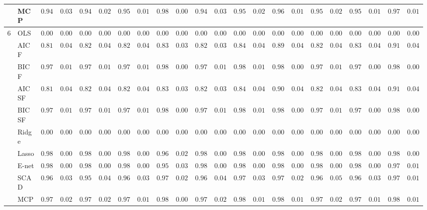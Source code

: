 \begin{tabular}{p{0.2cm}p{1cm}|p{0.6cm}p{0.6cm}|p{0.6cm}p{0.6cm}p{0.6cm}p{0.6cm}p{0.6cm}p{0.6cm}|p{0.6cm}p{0.6cm}p{0.6cm}p{0.6cm}p{0.6cm}p{0.6cm}|p{0.6cm}p{0.6cm}p{0.6cm}p{0.6cm}p{0.6cm}p{0.6cm}}
 & MCP  & $0.9483$ & $0.0345$ & $0.9439$ & $0.0255$ & $0.9562$ & $0.0197$ & $0.9809$ & $0.0089$ & $0.9468$ & $0.0361$ & $0.9568$ & $0.0276$ & $0.9694$ & $0.0164$ & $0.9514$ & $0.0295$ & $0.9559$ & $0.0197$ & $0.9791$ & $0.0119$ \\\hline
6 & OLS  & $0.0000$ & $0.0000$ & $0.0000$ & $0.0000$ & $0.0000$ & $0.0000$ & $0.0000$ & $0.0000$ & $0.0000$ & $0.0000$ & $0.0000$ & $0.0000$ & $0.0000$ & $0.0000$ & $0.0000$ & $0.0000$ & $0.0000$ & $0.0000$ & $0.0000$ & $0.0000$ \\
 & AIC F  & $0.8105$ & $0.0412$ & $0.8216$ & $0.0420$ & $0.8236$ & $0.0457$ & $0.8323$ & $0.0377$ & $0.8239$ & $0.0384$ & $0.8416$ & $0.0421$ & $0.8984$ & $0.0444$ & $0.8242$ & $0.0431$ & $0.8373$ & $0.0481$ & $0.9121$ & $0.0466$ \\
 & BIC F  & $0.9788$ & $0.0104$ & $0.9765$ & $0.0111$ & $0.9775$ & $0.0110$ & $0.9801$ & $0.0091$ & $0.9768$ & $0.0105$ & $0.9802$ & $0.0113$ & $0.9840$ & $0.0080$ & $0.9757$ & $0.0119$ & $0.9799$ & $0.0089$ & $0.9853$ & $0.0075$ \\
 & AIC SF  & $0.8114$ & $0.0407$ & $0.8220$ & $0.0421$ & $0.8251$ & $0.0444$ & $0.8332$ & $0.0377$ & $0.8245$ & $0.0380$ & $0.8443$ & $0.0411$ & $0.9015$ & $0.0422$ & $0.8254$ & $0.0421$ & $0.8389$ & $0.0465$ & $0.9122$ & $0.0466$ \\
 & BIC SF  & $0.9788$ & $0.0104$ & $0.9765$ & $0.0111$ & $0.9775$ & $0.0110$ & $0.9801$ & $0.0091$ & $0.9768$ & $0.0105$ & $0.9802$ & $0.0113$ & $0.9840$ & $0.0080$ & $0.9757$ & $0.0119$ & $0.9799$ & $0.0089$ & $0.9854$ & $0.0072$ \\
 & Ridge  & $0.0000$ & $0.0000$ & $0.0000$ & $0.0000$ & $0.0000$ & $0.0000$ & $0.0000$ & $0.0000$ & $0.0000$ & $0.0000$ & $0.0000$ & $0.0000$ & $0.0000$ & $0.0000$ & $0.0000$ & $0.0000$ & $0.0000$ & $0.0000$ & $0.0000$ & $0.0000$ \\
 & Lasso  & $0.9895$ & $0.0000$ & $0.9892$ & $0.0023$ & $0.9889$ & $0.0023$ & $0.9697$ & $0.0214$ & $0.9895$ & $0.0000$ & $0.9894$ & $0.0011$ & $0.9872$ & $0.0049$ & $0.9895$ & $0.0000$ & $0.9893$ & $0.0015$ & $0.9824$ & $0.0098$ \\
 & E-net  & $0.9895$ & $0.0000$ & $0.9888$ & $0.0036$ & $0.9879$ & $0.0057$ & $0.9527$ & $0.0315$ & $0.9895$ & $0.0000$ & $0.9894$ & $0.0011$ & $0.9857$ & $0.0059$ & $0.9894$ & $0.0011$ & $0.9889$ & $0.0031$ & $0.9743$ & $0.0167$ \\
 & SCAD  & $0.9666$ & $0.0371$ & $0.9579$ & $0.0413$ & $0.9633$ & $0.0325$ & $0.9755$ & $0.0219$ & $0.9656$ & $0.0423$ & $0.9734$ & $0.0355$ & $0.9783$ & $0.0217$ & $0.9612$ & $0.0508$ & $0.9639$ & $0.0364$ & $0.9771$ & $0.0171$ \\
 & MCP  & $0.9777$ & $0.0240$ & $0.9749$ & $0.0246$ & $0.9786$ & $0.0184$ & $0.9837$ & $0.0081$ & $0.9762$ & $0.0279$ & $0.9834$ & $0.0167$ & $0.9832$ & $0.0126$ & $0.9749$ & $0.0296$ & $0.9781$ & $0.0199$ & $0.9818$ & $0.0115$ \\
\hline 
\end{tabular}

